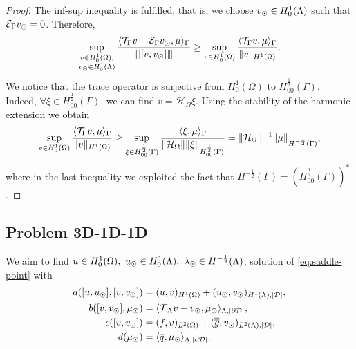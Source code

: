 \documentclass[r]{siamart171218}
\newcommand{\paolo}[1]{{\color{black}#1}}
\begin{document}
\begin{proof}

The inf-sup inequality is fulfilled, that is; 
we choose $v_{\odot} \in H^1_0(\Lambda)$ such that $\mathcal{E}_\Gamma v_{\odot} =0$. Therefore,
\begin{equation*}
\sup _{\substack{v\in H^1_0(\Omega),\\ v_{\odot} \in H^1_0(\Lambda)}} \frac{ \langle {\mathcal{T}_\Gamma} v  - \mathcal{E}_\Gamma v_{\odot}, \mu\rangle_\Gamma}{{\left\vert\kern-0.25ex\left\vert\kern-0.25ex\left\vert [v, v_{\odot}] \right\vert\kern-0.25ex\right\vert\kern-0.25ex\right\vert}} 
\geq \sup _{v\in H^1_0(\Omega)} \frac{ \langle {\mathcal{T}_\Gamma} v, \mu \rangle_\Gamma}{\|v\|_{H^1(\Omega)}}.
\end{equation*}
We notice that the trace operator is surjective from $H^1_0(\Omega)$ to $H^{\frac12}_{00}(\Gamma)$. Indeed, $\forall \xi \in H^{\frac 12}_{00}(\Gamma)$, 
we  can find $v=\mathcal{H}_\Omega \xi$. Using the stability of the harmonic extension we obtain
\begin{equation}\label{infsup_traceop}
\sup _{v\in H^1_0(\Omega)} \frac{ \langle \trace v, \mu \rangle_\Gamma}{\|v\|_{H^1(\Omega)}}
\geq  \sup _{\xi \in H^{\frac 12}_{00}(\Gamma )} \frac{ \langle \xi , \mu \rangle_\Gamma}{\|\mathcal{H}_\Omega\| \|\xi\|_{H^{\frac 12}_{00}(\Gamma)}}
= \|\mathcal{H}_\Omega\|^{-1} \|\mu\|_{H^{-\frac 12}(\Gamma)},
\end{equation}
where in the last inequality we exploited the fact that $H^{-\frac 12}(\Gamma)=(H^{\frac 12 }_{00}(\Gamma))^*$. 
\end{proof}

\subsection{Problem 3D-1D-1D}
We aim to find $u \in H^1_0(\Omega),\ u_{\odot} \in H^1_0(\Lambda), \ \lambda_{\odot} \in H^{-\frac12}(\Lambda)$,
solution of \eqref{eq:saddle-point} with
\begin{align*}
a([u, \ud], [v, \vd])&= (u,v)_{H^1(\Omega)} + (\ud,\vd)_{H^1(\Lambda),|\D|},
\\
b([v, \vd], \md)&=  \langle  \mtrace v - \vd, \md \rangle_{\Lambda, |\DD|},
\\
c([v,\vd])&= (f,v)_{L^2(\Omega)} + (\avrd{g},\vd)_{L^2(\Lambda),|\D|},
\\
d(\md)&=\paolo{\langle \avrc{q},\md\rangle_{\Lambda,|\DD|}}.
\end{align*}
\end{document}
